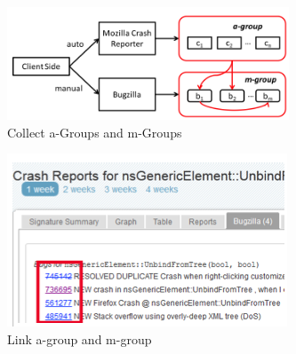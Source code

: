 \documentclass{llncs}
\begin{document}
%
%
%
%


\begin{figure}[!htb]
\centering
\includegraphics[width = 8.4cm, angle = 0]{images/approach1.png}
\caption{\small Collect a-Groups and m-Groups~\label{fig:dataprocess}}
\normalsize
\end{figure}

\begin{figure}[!htb]
\centering
\includegraphics[scale=0.8]{images/bugzilla_updated.png}
\caption{Link a-group and m-group~\label{fig:bugzilla}}
\normalsize
\end{figure}
\end{document}
